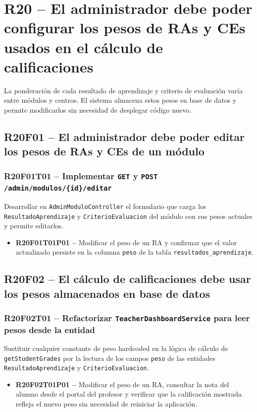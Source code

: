 \documentclass[12pt, a4paper]{report}
\begin{document}
\section{R20 -- El administrador debe poder configurar los pesos de RAs y CEs usados en el cálculo de calificaciones}

La ponderación de cada resultado de aprendizaje y criterio de evaluación varía entre módulos y centros. El sistema almacena estos pesos en base de datos y permite modificarlos sin necesidad de desplegar código nuevo.

\subsection{R20F01 -- El administrador debe poder editar los pesos de RAs y CEs de un módulo}

\subsubsection{R20F01T01 -- Implementar \texttt{GET} y \texttt{POST /admin/modulos/\{id\}/editar}}
Desarrollar en \texttt{AdminModuloController} el formulario que carga los \texttt{ResultadoAprendizaje} y \texttt{CriterioEvaluacion} del módulo con sus pesos actuales y permite editarlos.
\begin{itemize}
  \item \textbf{R20F01T01P01 --} Modificar el peso de un RA y confirmar que el valor actualizado persiste en la columna \texttt{peso} de la tabla \texttt{resultados\_aprendizaje}.
\end{itemize}

\subsection{R20F02 -- El cálculo de calificaciones debe usar los pesos almacenados en base de datos}

\subsubsection{R20F02T01 -- Refactorizar \texttt{TeacherDashboardService} para leer pesos desde la entidad}
Sustituir cualquier constante de peso hardcoded en la lógica de cálculo de \texttt{getStudentGrades} por la lectura de los campos \texttt{peso} de las entidades \texttt{ResultadoAprendizaje} y \texttt{CriterioEvaluacion}.
\begin{itemize}
  \item \textbf{R20F02T01P01 --} Modificar el peso de un RA, consultar la nota del alumno desde el portal del profesor y verificar que la calificación mostrada refleja el nuevo peso sin necesidad de reiniciar la aplicación.
\end{itemize}
\end{document}
